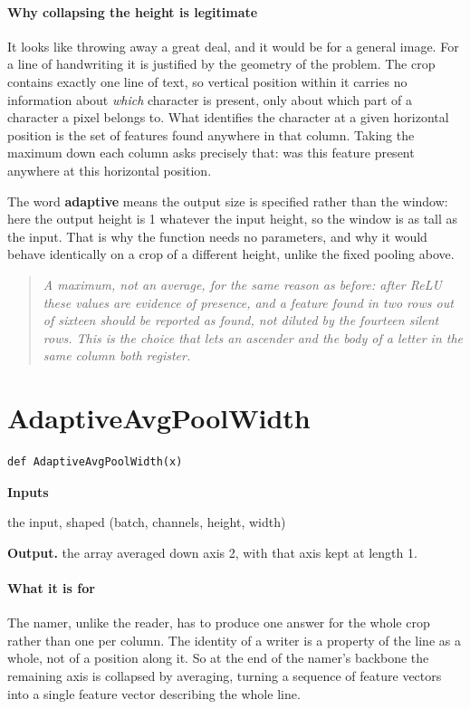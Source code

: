 \paragraph{Why collapsing the height is legitimate}
It looks like throwing away a great deal, and it would be for a general image. For a line of handwriting it is justified by the geometry of the problem. The crop contains exactly one line of text, so vertical position within it carries no information about \emph{which} character is present, only about which part of a character a pixel belongs to. What identifies the character at a given horizontal position is the set of features found anywhere in that column. Taking the maximum down each column asks precisely that: was this feature present anywhere at this horizontal position.

The word \textbf{adaptive} means the output size is specified rather than the window: here the output height is 1 whatever the input height, so the window is as tall as the input. That is why the function needs no parameters, and why it would behave identically on a crop of a different height, unlike the fixed pooling above.


\begin{quote}\small\itshape A maximum, not an average, for the same reason as before: after ReLU these values are evidence of presence, and a feature found in two rows out of sixteen should be reported as found, not diluted by the fourteen silent rows. This is the choice that lets an ascender and the body of a letter in the same column both register.\end{quote}

\section{AdaptiveAvgPoolWidth}
\begin{lstlisting}[style=sig]
def AdaptiveAvgPoolWidth(x)
\end{lstlisting}

\noindent\textbf{Inputs}
\begin{description}[leftmargin=2.2em,style=nextline,font=\normalfont\ttfamily]\setlength\itemsep{1pt}
  \item[{x}] \normalfont the input, shaped (batch, channels, height, width)
\end{description}

\noindent\textbf{Output.} the array averaged down axis 2, with that axis kept at length 1.


\paragraph{What it is for}
The namer, unlike the reader, has to produce one answer for the whole crop rather than one per column. The identity of a writer is a property of the line as a whole, not of a position along it. So at the end of the namer's backbone the remaining axis is collapsed by averaging, turning a sequence of feature vectors into a single feature vector describing the whole line.


